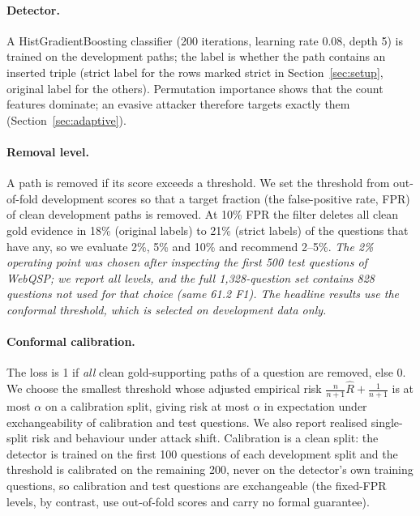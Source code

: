 \documentclass[preprint,12pt]{elsarticle}
\begin{document}
\paragraph{Detector.} A HistGradientBoosting classifier (200 iterations, learning rate 0.08, depth 5) is trained on the development paths; the label is whether the path contains an inserted triple (strict label for the rows marked strict in Section~\ref{sec:setup}, original label for the others). Permutation importance shows that the count features dominate; an evasive attacker therefore targets exactly them (Section~\ref{sec:adaptive}).

\paragraph{Removal level.} A path is removed if its score exceeds a threshold. We set the threshold from out-of-fold development scores so that a target fraction (the false-positive rate, FPR) of clean development paths is removed. At 10\% FPR the filter deletes all clean gold evidence in 18\% (original labels) to 21\% (strict labels) of the questions that have any, so we evaluate 2\%, 5\% and 10\% and recommend 2--5\%. \emph{The 2\% operating point was chosen after inspecting the first 500 test questions of WebQSP; we report all levels, and the full 1{,}328-question set contains 828 questions not used for that choice (same 61.2 F1). The headline results use the conformal threshold, which is selected on development data only.}

\paragraph{Conformal calibration.} The loss is 1 if \emph{all} clean gold-supporting paths of a question are removed, else 0. We choose the smallest threshold whose adjusted empirical risk $\frac{n}{n+1}\hat R + \frac{1}{n+1}$ is at most $\alpha$ on a calibration split, giving risk at most $\alpha$ in expectation under exchangeability of calibration and test questions. We also report realised single-split risk and behaviour under attack shift. Calibration is a clean split: the detector is trained on the first 100 questions of each development split and the threshold is calibrated on the remaining 200, never on the detector's own training questions, so calibration and test questions are exchangeable (the fixed-FPR levels, by contrast, use out-of-fold scores and carry no formal guarantee).
\end{document}
